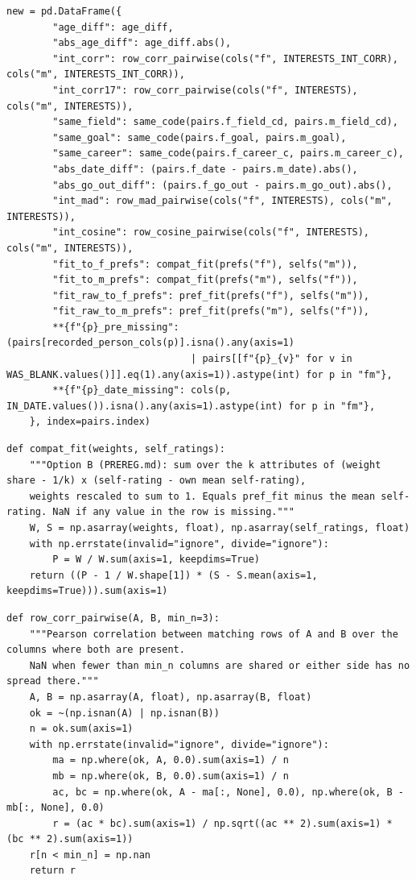 \documentclass[11pt]{article}
\begin{document}
\begin{lstlisting}[caption={The constructed pair features and flags (scripts/pairs.py)}]
    new = pd.DataFrame({
        "age_diff": age_diff,
        "abs_age_diff": age_diff.abs(),
        "int_corr": row_corr_pairwise(cols("f", INTERESTS_INT_CORR), cols("m", INTERESTS_INT_CORR)),
        "int_corr17": row_corr_pairwise(cols("f", INTERESTS), cols("m", INTERESTS)),
        "same_field": same_code(pairs.f_field_cd, pairs.m_field_cd),
        "same_goal": same_code(pairs.f_goal, pairs.m_goal),
        "same_career": same_code(pairs.f_career_c, pairs.m_career_c),
        "abs_date_diff": (pairs.f_date - pairs.m_date).abs(),
        "abs_go_out_diff": (pairs.f_go_out - pairs.m_go_out).abs(),
        "int_mad": row_mad_pairwise(cols("f", INTERESTS), cols("m", INTERESTS)),
        "int_cosine": row_cosine_pairwise(cols("f", INTERESTS), cols("m", INTERESTS)),
        "fit_to_f_prefs": compat_fit(prefs("f"), selfs("m")),
        "fit_to_m_prefs": compat_fit(prefs("m"), selfs("f")),
        "fit_raw_to_f_prefs": pref_fit(prefs("f"), selfs("m")),
        "fit_raw_to_m_prefs": pref_fit(prefs("m"), selfs("f")),
        **{f"{p}_pre_missing": (pairs[recorded_person_cols(p)].isna().any(axis=1)
                                | pairs[[f"{p}_{v}" for v in WAS_BLANK.values()]].eq(1).any(axis=1)).astype(int) for p in "fm"},
        **{f"{p}_date_missing": cols(p, IN_DATE.values()).isna().any(axis=1).astype(int) for p in "fm"},
    }, index=pairs.index)
\end{lstlisting}

\begin{lstlisting}[caption={Compatibility term, equation (1) (scripts/pairs.py)}]
def compat_fit(weights, self_ratings):
    """Option B (PREREG.md): sum over the k attributes of (weight share - 1/k) x (self-rating - own mean self-rating),
    weights rescaled to sum to 1. Equals pref_fit minus the mean self-rating. NaN if any value in the row is missing."""
    W, S = np.asarray(weights, float), np.asarray(self_ratings, float)
    with np.errstate(invalid="ignore", divide="ignore"):
        P = W / W.sum(axis=1, keepdims=True)
    return ((P - 1 / W.shape[1]) * (S - S.mean(axis=1, keepdims=True))).sum(axis=1)
\end{lstlisting}

\begin{lstlisting}[caption={Interest similarity over the interests both answered (scripts/pairs.py)}]
def row_corr_pairwise(A, B, min_n=3):
    """Pearson correlation between matching rows of A and B over the columns where both are present.
    NaN when fewer than min_n columns are shared or either side has no spread there."""
    A, B = np.asarray(A, float), np.asarray(B, float)
    ok = ~(np.isnan(A) | np.isnan(B))
    n = ok.sum(axis=1)
    with np.errstate(invalid="ignore", divide="ignore"):
        ma = np.where(ok, A, 0.0).sum(axis=1) / n
        mb = np.where(ok, B, 0.0).sum(axis=1) / n
        ac, bc = np.where(ok, A - ma[:, None], 0.0), np.where(ok, B - mb[:, None], 0.0)
        r = (ac * bc).sum(axis=1) / np.sqrt((ac ** 2).sum(axis=1) * (bc ** 2).sum(axis=1))
    r[n < min_n] = np.nan
    return r
\end{lstlisting}
\end{document}
